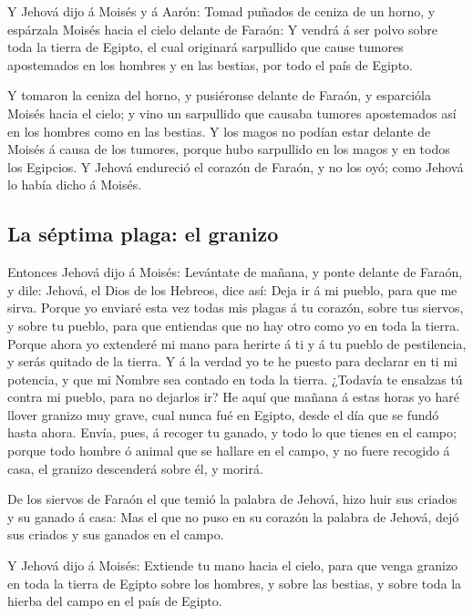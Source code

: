  Y Jehová dijo á Moisés y á Aarón: Tomad puñados de ceniza
de un horno, y espárzala Moisés hacia el cielo delante de Faraón:
 Y vendrá á ser polvo sobre toda la tierra de Egipto, el
cual originará sarpullido que cause tumores apostemados en los hombres y
en las bestias, por todo el país de Egipto.

 Y tomaron la ceniza del horno, y pusiéronse delante de
Faraón, y esparcióla Moisés hacia el cielo; y vino un sarpullido que
causaba tumores apostemados así en los hombres como en las bestias.
 Y los magos no podían estar delante de Moisés á causa de
los tumores, porque hubo sarpullido en los magos y en todos los
Egipcios.  Y Jehová endureció el corazón de Faraón, y no
los oyó; como Jehová lo había dicho á Moisés.

\hypertarget{la-suxe9ptima-plaga-el-granizo}{%
\subsection{La séptima plaga: el
granizo}\label{la-suxe9ptima-plaga-el-granizo}}

 Entonces Jehová dijo á Moisés: Levántate de mañana, y
ponte delante de Faraón, y dile: Jehová, el Dios de los Hebreos, dice
así: Deja ir á mi pueblo, para que me sirva.  Porque yo
enviaré esta vez todas mis plagas á tu corazón, sobre tus siervos, y
sobre tu pueblo, para que entiendas que no hay otro como yo en toda la
tierra.  Porque ahora yo extenderé mi mano para herirte á
ti y á tu pueblo de pestilencia, y serás quitado de la tierra.
 Y á la verdad yo te he puesto para declarar en ti mi
potencia, y que mi Nombre sea contado en toda la tierra. 
¿Todavía te ensalzas tú contra mi pueblo, para no dejarlos ir?
 He aquí que mañana á estas horas yo haré llover granizo
muy grave, cual nunca fué en Egipto, desde el día que se fundó hasta
ahora.  Envía, pues, á recoger tu ganado, y todo lo que
tienes en el campo; porque todo hombre ó animal que se hallare en el
campo, y no fuere recogido á casa, el granizo descenderá sobre él, y
morirá.

 De los siervos de Faraón el que temió la palabra de
Jehová, hizo huir sus criados y su ganado á casa:  Mas el
que no puso en su corazón la palabra de Jehová, dejó sus criados y sus
ganados en el campo.

 Y Jehová dijo á Moisés: Extiende tu mano hacia el cielo,
para que venga granizo en toda la tierra de Egipto sobre los hombres, y
sobre las bestias, y sobre toda la hierba del campo en el país de
Egipto.

